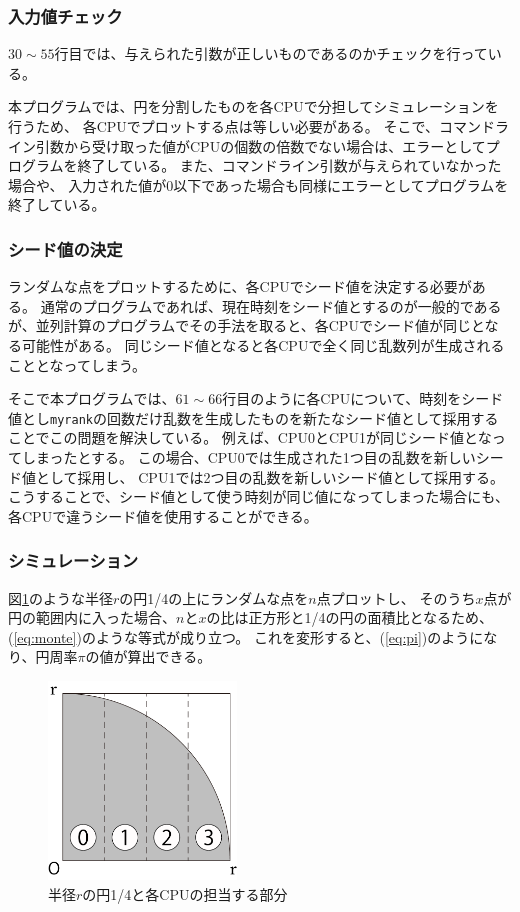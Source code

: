 \documentclass[a4j,titlepage]{jsarticle}
\begin{document}
\subsubsection{入力値チェック}
$30 \sim 55$行目では、与えられた引数が正しいものであるのかチェックを行っている。

本プログラムでは、円を分割したものを各CPUで分担してシミュレーションを行うため、
各CPUでプロットする点は等しい必要がある。
そこで、コマンドライン引数から受け取った値がCPUの個数の倍数でない場合は、エラーとしてプログラムを終了している。
また、コマンドライン引数が与えられていなかった場合や、
入力された値が0以下であった場合も同様にエラーとしてプログラムを終了している。

\subsubsection{シード値の決定}
ランダムな点をプロットするために、各CPUでシード値を決定する必要がある。
通常のプログラムであれば、現在時刻をシード値とするのが一般的であるが、並列計算のプログラムでその手法を取ると、各CPUでシード値が同じとなる可能性がある。
同じシード値となると各CPUで全く同じ乱数列が生成されることとなってしまう。

そこで本プログラムでは、$61 \sim 66$行目のように各CPUについて、時刻をシード値とし\texttt{myrank}の回数だけ乱数を生成したものを新たなシード値として採用することでこの問題を解決している。
例えば、CPU0とCPU1が同じシード値となってしまったとする。
この場合、CPU0では生成された1つ目の乱数を新しいシード値として採用し、
CPU1では2つ目の乱数を新しいシード値として採用する。
こうすることで、シード値として使う時刻が同じ値になってしまった場合にも、各CPUで違うシード値を使用することができる。

\subsubsection{シミュレーション}
図\ref{fig:sim}のような半径$r$の円1/4の上にランダムな点を$n$点プロットし、
そのうち$x$点が円の範囲内に入った場合、$n$と$x$の比は正方形と1/4の円の面積比となるため、(\ref{eq:monte})のような等式が成り立つ。
これを変形すると、(\ref{eq:pi})のようになり、円周率$\pi$の値が算出できる。

\begin{figure}[H]
  \centering
  \includegraphics[width=5cm]{./images/circle.pdf}
  \caption{半径$r$の円1/4と各CPUの担当する部分}
  \label{fig:sim}
\end{figure}
\end{document}
